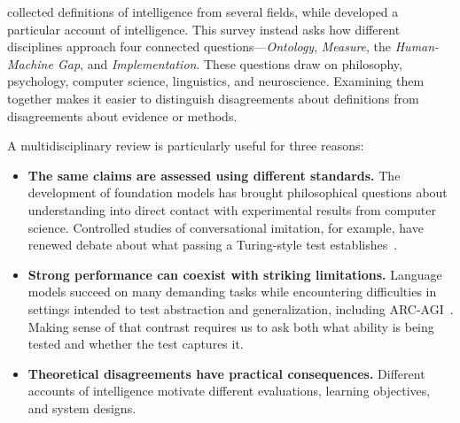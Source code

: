 \documentclass[acmsmall,screen,review,anonymous]{acmart}
\begin{document}





\citet{legg2007collectiondefinitionsintelligence} collected definitions of intelligence from several fields, while \citet{wang2019define} developed a particular account of intelligence.
%
This survey instead asks how different disciplines approach four connected questions---\textit{Ontology}, \textit{Measure}, the \textit{Human-Machine Gap}, and \textit{Implementation}.
%
These questions draw on philosophy, psychology, computer science, linguistics, and neuroscience.
%
Examining them together makes it easier to distinguish disagreements about definitions from disagreements about evidence or methods.

A multidisciplinary review is particularly useful for three reasons:
\begin{itemize}
    \item \textbf{The same claims are assessed using different standards.}
%
    The development of foundation models has brought philosophical questions about understanding into direct contact with experimental results from computer science.
%
    Controlled studies of conversational imitation, for example, have renewed debate about what passing a Turing-style test establishes~\citep{Jones2026}.
    \item \textbf{Strong performance can coexist with striking limitations.}
%
    Language models succeed on many demanding tasks while encountering difficulties in settings intended to test abstraction and generalization, including ARC-AGI~\citep{chollet2019measureintelligence, chollet2026arcagi2newchallengefrontier, foundation2026arcagi3newchallengefrontier}.
%
    Making sense of that contrast requires us to ask both what ability is being tested and whether the test captures it.
    \item \textbf{Theoretical disagreements have practical consequences.}
%
    Different accounts of intelligence motivate different evaluations, learning objectives, and system designs.
\end{itemize}
\end{document}
